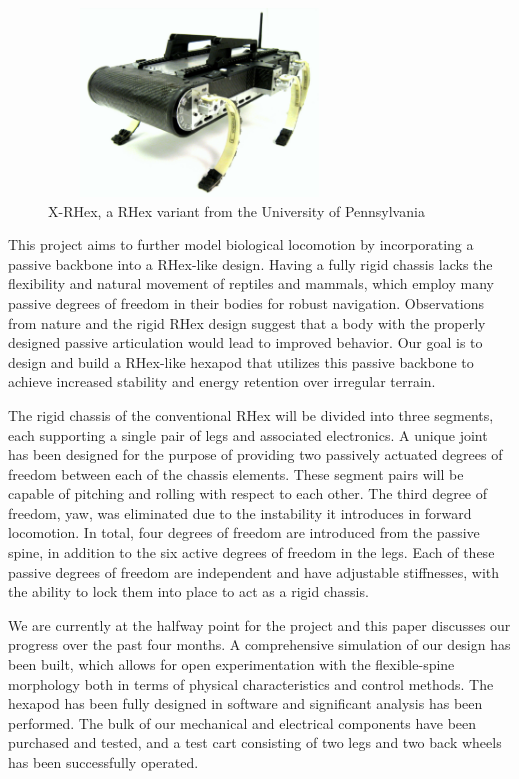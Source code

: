 \documentclass[11pt]{article}
\begin{document}
\begin{figure}[h]
\centering
\includegraphics[width=8cm,height=5cm]{RHex.jpg}
\caption{X-RHex, a RHex variant from the University of Pennsylvania}
\end{figure}

This project aims to further model biological locomotion by incorporating a passive backbone into a RHex-like design. Having a fully rigid chassis lacks the flexibility and natural movement of reptiles and mammals, which employ many passive degrees of freedom in their bodies for robust navigation.  Observations from nature and the rigid RHex design suggest that a body with the properly designed passive articulation would lead to improved behavior. Our goal is to design and build a RHex-like hexapod that utilizes this passive backbone to achieve increased stability and energy retention over irregular terrain.

The rigid chassis of the conventional RHex will be divided into three segments, each supporting a single pair of legs and associated electronics. A unique joint has been designed for the purpose of providing two passively actuated degrees of freedom between each of the chassis elements. These segment pairs will be capable of pitching and rolling with respect to each other. The third degree of freedom, yaw, was eliminated due to the instability it introduces in forward locomotion. In total, four degrees of freedom are introduced from the passive spine, in addition to the six active degrees of freedom in the legs. Each of these passive degrees of freedom are independent and have adjustable stiffnesses, with the ability to lock them into place
to act as a rigid chassis.

We are currently at the halfway point for the project and this paper discusses our progress over the past four months. A comprehensive simulation of our design has been built, which allows for open experimentation with the flexible-spine morphology both in terms of physical characteristics and control methods. The hexapod has been fully designed in software and significant analysis has been performed. The bulk of our mechanical and electrical components have been purchased and tested, and a test cart consisting of two legs and two back wheels has been successfully operated.
\end{document}
